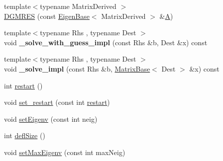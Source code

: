 \begin{DoxyCompactItemize}
\item 
{\footnotesize template$<$typename Matrix\+Derived $>$ }\\\hyperlink{class_eigen_1_1_d_g_m_r_e_s_a800fcf37c0ac66f76d5c070e4aeae2a7}{D\+G\+M\+R\+ES} (const \hyperlink{group___core___module_struct_eigen_1_1_eigen_base}{Eigen\+Base}$<$ Matrix\+Derived $>$ \&\hyperlink{group___core___module_class_eigen_1_1_matrix}{A})
\item 
\mbox{\label{class_eigen_1_1_d_g_m_r_e_s_aa339fee66d9861ae803bdc898ddf6a34}} 
{\footnotesize template$<$typename Rhs , typename Dest $>$ }\\void {\bfseries \+\_\+solve\+\_\+with\+\_\+guess\+\_\+impl} (const Rhs \&b, Dest \&x) const
\item 
\mbox{\label{class_eigen_1_1_d_g_m_r_e_s_ab8325945ebdbd9d75cc796b6cde5a96e}} 
{\footnotesize template$<$typename Rhs , typename Dest $>$ }\\void {\bfseries \+\_\+solve\+\_\+impl} (const Rhs \&b, \hyperlink{group___core___module_class_eigen_1_1_matrix_base}{Matrix\+Base}$<$ Dest $>$ \&x) const
\item 
int \hyperlink{class_eigen_1_1_d_g_m_r_e_s_a8017848f8ea8abc26f9524a05c0d2476}{restart} ()
\item 
void \hyperlink{class_eigen_1_1_d_g_m_r_e_s_a2f99e7b3b04da0ecb6607630a82b4e56}{set\+\_\+restart} (const int \hyperlink{class_eigen_1_1_d_g_m_r_e_s_a8017848f8ea8abc26f9524a05c0d2476}{restart})
\item 
void \hyperlink{class_eigen_1_1_d_g_m_r_e_s_a7510f3ded5959a8d98c3cd3aabebc84b}{set\+Eigenv} (const int neig)
\item 
int \hyperlink{class_eigen_1_1_d_g_m_r_e_s_a724f0f2f124376c3694fd69c59a88d5a}{defl\+Size} ()
\item 
void \hyperlink{class_eigen_1_1_d_g_m_r_e_s_ada9f5fbba382ae941f207322a8b84a01}{set\+Max\+Eigenv} (const int max\+Neig)
\end{DoxyCompactItemize}
